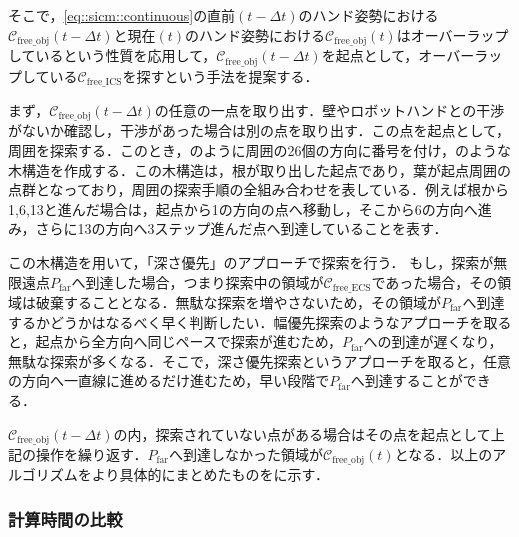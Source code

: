 \documentclass[a4paper,twoside,12pt,papersize, dvipdfmx]{iirthesis}
\begin{document}
そこで，\eqref{eq::sicm::continuous}の直前$(t-\Delta t)$のハンド姿勢における$\mathcal{C}_{\mathrm{free\_obj}}(t-\Delta t)$と現在$(t)$のハンド姿勢における$\mathcal{C}_{\mathrm{free\_obj}}(t)$はオーバーラップしているという性質を応用して，$\mathcal{C}_{\mathrm{free\_obj}}(t-\Delta t)$を起点として，オーバーラップしている$\mathcal{C}_{\mathrm{free\_ICS}}$を探すという手法を提案する．\par

まず，$\mathcal{C}_{\mathrm{free\_obj}}(t-\Delta t)$の任意の一点を取り出す．壁やロボットハンドとの干渉がないか確認し，干渉があった場合は別の点を取り出す．この点を起点として，周囲を探索する．このとき，\figref{}のように周囲の26個の方向に番号を付け，\figref{}のような木構造を作成する．この木構造は，根が取り出した起点であり，葉が起点周囲の点群となっており，周囲の探索手順の全組み合わせを表している．例えば根から1,6,13と進んだ場合は，起点から1の方向の点へ移動し，そこから6の方向へ進み，さらに13の方向へ3ステップ進んだ点へ到達していることを表す．\par

この木構造を用いて，「深さ優先」のアプローチで探索を行う．
もし，探索が無限遠点$P_{\mathrm {far}}$へ到達した場合，つまり探索中の領域が$\mathcal{C}_{\mathrm{free\_ECS}}$であった場合，その領域は破棄することとなる．無駄な探索を増やさないため，その領域が$P_{\mathrm {far}}$へ到達するかどうかはなるべく早く判断したい．幅優先探索のようなアプローチを取ると，起点から全方向へ同じペースで探索が進むため，$P_{\mathrm {far}}$への到達が遅くなり，無駄な探索が多くなる．そこで，深さ優先探索というアプローチを取ると，任意の方向へ一直線に進めるだけ進むため，早い段階で$P_{\mathrm {far}}$へ到達することができる．\par

$\mathcal{C}_{\mathrm{free\_obj}}(t-\Delta t)$の内，探索されていない点がある場合はその点を起点として上記の操作を繰り返す．$P_{\mathrm {far}}$へ到達しなかった領域が$\mathcal{C}_{\mathrm{free\_obj}}(t)$となる．以上のアルゴリズムをより具体的にまとめたものをに示す．


\subsubsection{計算時間の比較}
\end{document}
